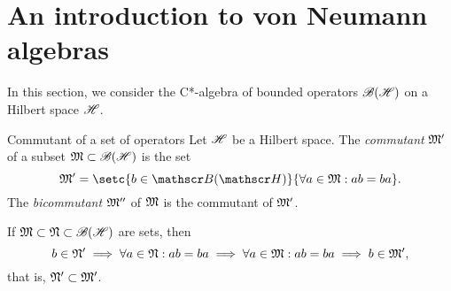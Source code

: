 \section{An introduction to von Neumann algebras}
In this section, we consider the C*-algebra of bounded operators \(\mathscr{B}(\mathscr{H})\) on a Hilbert space \(\mathscr{H}\).
\begin{definition}{Commutant of a set of operators}{}
    Let \(\mathscr{H}\) be a Hilbert space. The \emph{commutant} \(\mathfrak{M}'\) of a subset \(\mathfrak{M} \subset \mathscr{B}(\mathscr{H})\) is the set
    \begin{equation*}
        \algebra{M}' = \setc{b \in \bounded(\hilbert)}{\forall a \in \algebra{M} : ab = ba}.
    \end{equation*}
    The \emph{bicommutant} \(\mathfrak{M}''\) of \(\mathfrak{M}\) is the commutant of \(\mathfrak{M}'\).
\end{definition}
\begin{remark}
    If \(\mathfrak{M} \subset \mathfrak{N} \subset \mathscr{B}(\mathscr{H})\) are sets, then
    \begin{equation*}
        b \in \mathfrak{N}' \implies \forall a \in \mathfrak{N} : ab = ba \implies \forall a \in \mathfrak{M} : ab = ba \implies b \in \mathfrak{M}',
    \end{equation*}
    that is, \(\mathfrak{N}' \subset \mathfrak{M}'\).
\end{remark}

